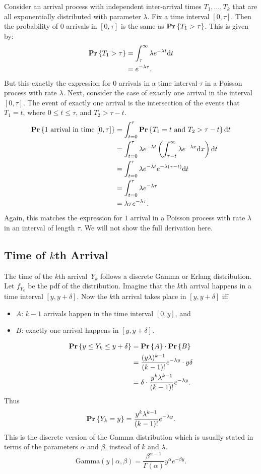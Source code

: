 Consider an arrival process with independent inter-arrival times $T_1, \ldots, T_k$ that are all exponentially distributed with
parameter $\lambda$. Fix a time interval $[0, \tau]$. Then the probability of $0$ arrivals in $[0, \tau]$ is the same as
$\mathbf{Pr} \left \{ T_1 > \tau \right \}$. This is given by:
\begin{align*}
\mathbf{Pr} \left \{ T_1 > \tau \right \} & = \int_{\tau}^{\infty} \lambda e^{- \lambda t} \text{d} t \\
        & = e^{- \lambda \tau}.
\end{align*}
But this exactly the expression for $0$ arrivals in a time interval $\tau$ in a Poisson process with rate $\lambda$. Next, consider
the case of exactly one arrival in the interval $[0, \tau]$. The event of exactly one arrival is the intersection
of the events that $T_1 = t$, where $0 \leq t \leq \tau$, and $T_2 > \tau - t$.
\begin{align*}
    \mathbf{Pr} \left \{ 1 \text{ arrival in time } [0, \tau] \right \} & = \int_{t = 0}^{\tau} \mathbf{Pr} \left \{ T_1 = t \text{ and } T_2 > \tau - t \right \} \text{d} t \\
        & = \int_{t = 0}^{\tau} \lambda e^{- \lambda t} \left ( \int_{\tau - t}^{\infty} \lambda e^{-\lambda x } \text{d} x \right ) \text{d} t \\
        & = \int_{t = 0}^{\tau} \lambda e^{- \lambda t} e^{- \lambda (\tau - t)} \text{d} t \\
        & = \int_{t = 0}^{\tau} \lambda e^{- \lambda \tau} \\
        & = \lambda \tau e^{- \lambda \tau}.
\end{align*}
Again, this matches the expression for $1$ arrival in a Poisson process with rate $\lambda$ in an interval of length $\tau$. We will 
not show the full derivation here.

\subsection{Time of $k$th Arrival}
The time of the $k$th arrival~$Y_k$ follows a discrete Gamma or Erlang distribution. Let $f_{Y_k}$ be the pdf of the 
distribution. Imagine that the $k$th arrival happens in a time interval $[y, y + \delta]$. Now the $k$th arrival takes place 
in $[y, y + \delta]$ iff 
\begin{itemize}
    \item $A$: $k - 1$ arrivals happen in the time interval $[0, y]$, and 
    \item $B$: exactly one arrival happens in $[y, y + \delta]$. 
\end{itemize}
\begin{align*}
    \mathbf{Pr} \left \{ y \leq Y_k \leq y + \delta \right \} & = \mathbf{Pr} \left \{ A \right \} \cdot \mathbf{Pr} \left \{ B \right \} \\
        & = \frac{(y \lambda)^{k - 1}}{(k - 1)!} e^{- \lambda y} \cdot y \delta \\
        & = \delta \cdot \frac{y^k \lambda^{k - 1}}{(k - 1)!} e^{- \lambda y}.  
\end{align*}  
Thus 
\[
    \mathbf{Pr} \left \{ Y_k = y \right \} = \frac{y^k \lambda^{k - 1}}{(k - 1)!} e^{- \lambda y}.
\]
This is the discrete version of the Gamma distribution which is usually stated in terms of the parameters $\alpha$ and $\beta$, instead of $k$ and $\lambda$. 
\[
    \text{Gamma}(y \mid \alpha, \beta) =  \frac{\beta^{\alpha - 1}}{\Gamma(\alpha)} y^{\alpha} e^{- \beta y}.
\]
